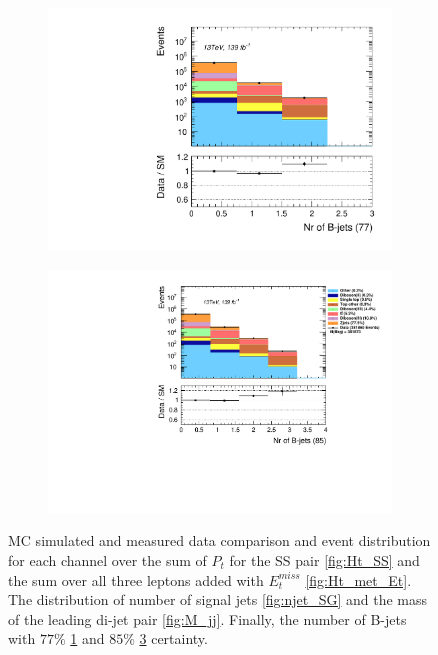 \begin{figure}[H]
{\begin{subfigure}{.405\textwidth}
        \includegraphics[width=\textwidth]{Figures/FeaturesHistograms/nbjet77.pdf}
        \caption{}
        \label{fig:nbjet77}
    \end{subfigure}
    \hfill
    \begin{subfigure}{.525\textwidth}
        \includegraphics[width=\textwidth]{Figures/FeaturesHistograms/nbjet85.pdf}
        \caption{}
        \label{fig:nbjet85}
    \end{subfigure}
    }
    \caption[\ac{MC} simulated and measured data comparison and event distribution for each channel over the sum of $P_t$
    for the SS pair and the sum over all three leptons added with $E_t^{miss}$. The distribution of number of 
    signal jets and the mass of the leading di-jet pair. Finally, the number of B-jets with $77\%$ and $85\%$ 
    certainty.]{\ac{MC} simulated and measured data comparison and event distribution for each channel over the sum of $P_t$
    for the SS pair \ref{fig:Ht_SS} and the sum over all three leptons added with $E_t^{miss}$
    \ref{fig:Ht_met_Et}. The distribution of number of signal jets \ref{fig:njet_SG} and the mass 
    of the leading di-jet pair \ref{fig:M_jj}. Finally, the number of B-jets with $77\%$ \ref{fig:nbjet77} and $85\%$ 
    \ref{fig:nbjet85} certainty.}
\end{figure}
